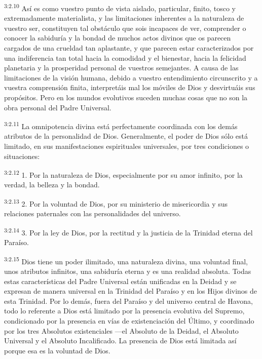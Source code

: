 \par
\textsuperscript{3:2.10} Así es como vuestro punto de vista aislado, particular, finito, tosco y extremadamente materialista, y las limitaciones inherentes a la naturaleza de vuestro ser, constituyen tal obstáculo que sois incapaces de ver, comprender o conocer la sabiduría y la bondad de muchos actos divinos que os parecen cargados de una crueldad tan aplastante, y que parecen estar caracterizados por una indiferencia tan total hacia la comodidad y el bienestar, hacia la felicidad planetaria y la prosperidad personal de vuestros semejantes. A causa de las limitaciones de la visión humana, debido a vuestro entendimiento circunscrito y a vuestra comprensión finita, interpretáis mal los móviles de Dios y desvirtuáis sus propósitos. Pero en los mundos evolutivos suceden muchas cosas que no son la obra personal del Padre Universal.

\par
\textsuperscript{3:2.11} La omnipotencia divina está perfectamente coordinada con los demás atributos de la personalidad de Dios. Generalmente, el poder de Dios sólo está limitado, en sus manifestaciones espirituales universales, por tres condiciones o situaciones:

\par
\textsuperscript{3:2.12} 1. Por la naturaleza de Dios, especialmente por su amor infinito, por la verdad, la belleza y la bondad.

\par
\textsuperscript{3:2.13} 2. Por la voluntad de Dios, por su ministerio de misericordia y sus relaciones paternales con las personalidades del universo.

\par
\textsuperscript{3:2.14} 3. Por la ley de Dios, por la rectitud y la justicia de la Trinidad eterna del Paraíso.

\par
\textsuperscript{3:2.15} Dios tiene un poder ilimitado, una naturaleza divina, una voluntad final, unos atributos infinitos, una sabiduría eterna y es una realidad absoluta. Todas estas características del Padre Universal están unificadas en la Deidad y se expresan de manera universal en la Trinidad del Paraíso y en los Hijos divinos de esta Trinidad. Por lo demás, fuera del Paraíso y del universo central de Havona, todo lo referente a Dios está limitado por la presencia evolutiva del Supremo, condicionado por la presencia en vías de existenciación del Último, y coordinado por los tres Absolutos existenciales ---el Absoluto de la Deidad, el Absoluto Universal y el Absoluto Incalificado. La presencia de Dios está limitada así porque esa es la voluntad de Dios.


